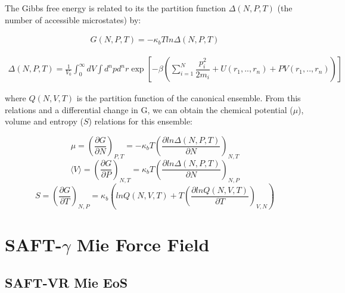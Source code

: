 The Gibbs free energy is related to its the partition function $\Delta (N,P,T)$ (the number of accessible microstates) by:

\begin{equation}
\label{eq:fisobari}
\begin{aligned}
G(N,P,T) = -\kappa_{b}T ln \Delta (N,P,T)
\end{aligned}
\end{equation}

\begin{equation}
\label{eq:partiso}
\begin{aligned}
\Delta (N,P,T) = \frac{1}{V_{0}} \int_{0}^{\infty} dV \int d^{n}p d^{n}r \exp \left[ -\beta \left( \sum_{i=1}^{N}\dfrac{p_{i}^{2}}{2m_{i}} + U(r_{1},..,r_{n}) + PV(r_{1},..,r_{n}) \right) \right]
\end{aligned}
\end{equation}

where $Q (N,V,T)$ is the partition function of the canonical ensemble. From this relations and a differential change in G, we can obtain the chemical potential ($\mu$), volume and entropy ($S$) relations for this ensemble:

\begin{equation}
\mu = (\frac{\partial G}{\partial N})_{P,T} = - \kappa_{b} T (\frac{\partial ln \Delta (N,P,T)}{\partial N})_{N,T}
\end{equation}  
\begin{equation}
\langle V \rangle= (\frac{\partial G}{\partial P})_{N,T}= \kappa_{b} T (\frac{\partial ln \Delta (N,P,T)}{\partial N})_{N,P}
\end{equation}
\begin{equation}
S = (\frac{\partial G}{\partial T})_{N,P}= \kappa_{b}  (ln Q(N,V,T)+ T(\frac{\partial ln Q (N,V,T)}{\partial T})_{V,N})
\end{equation}
 
\section{SAFT-$\gamma$ Mie Force Field}


\subsection{SAFT-VR Mie EoS}

